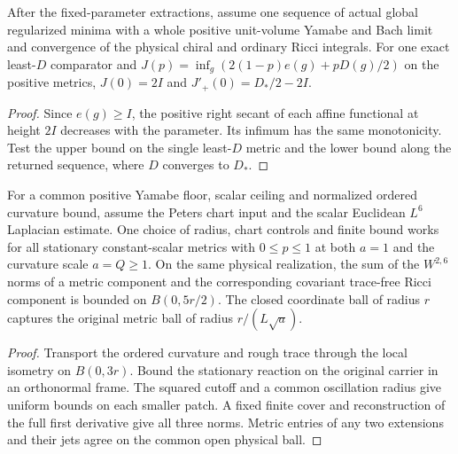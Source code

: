 \begin{proposition}
\label{prop:ed51-slope}
\leanok
After the fixed-parameter extractions, assume one sequence of actual global
regularized minima with a whole positive unit-volume Yamabe and Bach
limit and convergence of the physical chiral and ordinary Ricci integrals.
For one exact least-$D$ comparator and $J(p)=\inf_g(2(1-p)e(g)+pD(g)/2)$
on the positive metrics, $J(0)=2I$ and $J'_+(0)=D_*/2-2I$.
\end{proposition}
\begin{proof}
\leanok
Since $e(g)\ge I$, the positive right secant of each affine functional
at height $2I$ decreases with the parameter. Its infimum has the same
monotonicity. Test the upper bound on the single least-$D$ metric and
the lower bound along the returned sequence, where $D$ converges to $D_*$.
\end{proof}

\begin{proposition}
\label{prop:ed51-coupled}
\leanok
For a common positive Yamabe floor, scalar ceiling and normalized ordered
curvature bound, assume the Peters chart input and the scalar Euclidean
$L^6$ Laplacian estimate. One choice of radius, chart controls and finite bound
works for all stationary constant-scalar metrics with $0\le p\le1$ at both
$a=1$ and the curvature scale $a=Q\ge1$. On the same physical realization,
the sum of the $W^{2,6}$ norms of a metric component and the corresponding
covariant trace-free Ricci component is bounded on $B(0,5r/2)$.
The closed coordinate ball of radius $r$ captures the original metric
ball of radius $r/(L\sqrt a)$.
\end{proposition}
\begin{proof}
\leanok
Transport the ordered curvature and rough trace through the local isometry on
$B(0,3r)$. Bound the stationary reaction on the original carrier in an
orthonormal frame. The squared cutoff and a common oscillation radius give
uniform bounds on each smaller patch. A fixed finite cover and reconstruction
of the full first derivative give all three norms. Metric entries of any two
extensions and their jets agree on the common open physical ball.
\end{proof}

